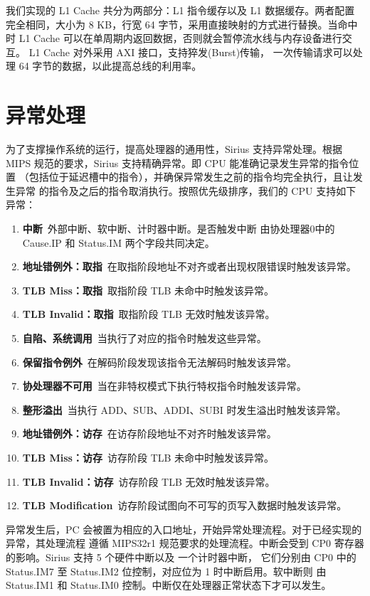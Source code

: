 \documentclass[blue,normal,cn,hide]{elegantbook}
\begin{document}
我们实现的 L1 Cache 共分为两部分：L1 指令缓存以及 L1 数据缓存。两者配置
完全相同，大小为 8 KB，行宽 64 字节，采用直接映射的方式进行替换。当命中时
L1 Cache 可以在单周期内返回数据，否则就会暂停流水线与内存设备进行交互。
L1 Cache 对外采用 AXI 接口，支持猝发(Burst)传输，
一次传输请求可以处理 64 字节的数据，以此提高总线的利用率。

\section{异常处理}

为了支撑操作系统的运行，提高处理器的通用性，Sirius 支持异常处理。根据 MIPS 
规范的要求，Sirius 支持精确异常。即 CPU 能准确记录发生异常的指令位置
（包括位于延迟槽中的指令），并确保异常发生之前的指令均完全执行，且让发生异常
的指令及之后的指令取消执行。按照优先级排序，我们的 CPU 支持如下异常：

\begin{enumerate}
    \item \textbf{中断}\ 外部中断、软中断、计时器中断。是否触发中断
    由协处理器0中的 Cause.IP 和 Status.IM 两个字段共同决定。
    \item \textbf{地址错例外：取指}\ 在取指阶段地址不对齐或者出现权限错误时触发该异常。
    \item \textbf{TLB Miss：取指}\ 取指阶段 TLB 未命中时触发该异常。
    \item \textbf{TLB Invalid：取指}\ 取指阶段 TLB 无效时触发该异常。
    \item \textbf{自陷、系统调用}\ 当执行了对应的指令时触发这些异常。
    \item \textbf{保留指令例外}\ 在解码阶段发现该指令无法解码时触发该异常。
    \item \textbf{协处理器不可用}\ 当在非特权模式下执行特权指令时触发该异常。
    \item \textbf{整形溢出}\ 当执行 ADD、SUB、ADDI、SUBI 时发生溢出时触发该异常。
    \item \textbf{地址错例外：访存}\ 在访存阶段地址不对齐时触发该异常。
    \item \textbf{TLB Miss：访存}\ 访存阶段 TLB 未命中时触发该异常。
    \item \textbf{TLB Invalid：访存}\ 访存阶段 TLB 无效时触发该异常。
    \item \textbf{TLB Modification}\ 访存阶段试图向不可写的页写入数据时触发该异常。
\end{enumerate}

异常发生后，PC 会被置为相应的入口地址，开始异常处理流程。对于已经实现的异常，其处理流程
遵循 MIPS32r1 规范要求的处理流程。中断会受到 CP0 寄存器的影响。Sirius 支持 5 个硬件中断以及
一个计时器中断，
它们分别由 CP0 中的 Status.IM7 至 Status.IM2 位控制，对应位为 1 时中断启用。软中断则
由 Status.IM1 和 Status.IM0 控制。中断仅在处理器正常状态下才可以发生。
\end{document}
